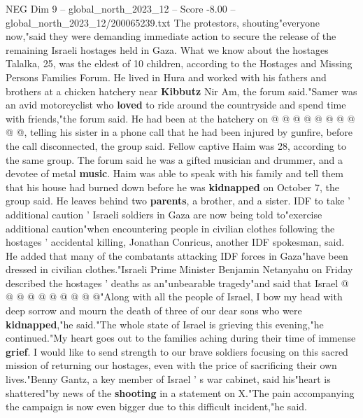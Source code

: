 \begin{textsample}{NEG Dim 9 – global\_north\_2023\_12 – Score -8.00 – global\_north\_2023\_12/200065239.txt}
The protestors, shouting"everyone now,"said they were demanding immediate action to secure the release of the remaining Israeli hostages held in Gaza.
What we know about the hostages Talalka, 25, was the eldest of 10 children, according to the Hostages and Missing Persons Families Forum.
He lived in Hura and worked with his fathers and brothers at a chicken hatchery near \textbf{Kibbutz} Nir Am, the forum said."Samer was an avid motorcyclist who \textbf{loved} to ride around the countryside and spend time with friends,"the forum said.
He had been at the hatchery on @ @ @ @ @ @ @ @ @ @, telling his sister in a phone call that he had been injured by gunfire, before the call disconnected, the group said.
Fellow captive Haim was 28, according to the same group.
The forum said he was a gifted musician and drummer, and a devotee of metal \textbf{music}.
Haim was able to speak with his family and tell them that his house had burned down before he was \textbf{kidnapped} on October 7, the group said.
He leaves behind two \textbf{parents}, a brother, and a sister.
IDF to take ' additional caution ' Israeli soldiers in Gaza are now being told to"exercise additional caution"when encountering people in civilian clothes following the hostages ' accidental killing, Jonathan Conricus, another IDF spokesman, said.
He added that many of the combatants attacking IDF forces in Gaza"have been dressed in civilian clothes."Israeli Prime Minister Benjamin Netanyahu on Friday described the hostages ' deaths as an"unbearable tragedy"and said that Israel @ @ @ @ @ @ @ @ @ @"Along with all the people of Israel, I bow my head with deep sorrow and mourn the death of three of our dear sons who were \textbf{kidnapped},"he said."The whole state of Israel is grieving this evening,"he continued."My heart goes out to the families aching during their time of immense \textbf{grief}.
I would like to send strength to our brave soldiers focusing on this sacred mission of returning our hostages, even with the price of sacrificing their own lives."Benny Gantz, a key member of Israel ' s war cabinet, said his"heart is shattered"by news of the \textbf{shooting} in a statement on X."The pain accompanying the campaign is now even bigger due to this difficult incident,"he said.

\end{textsample}
